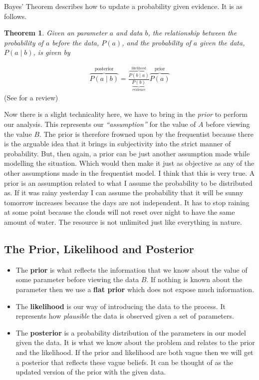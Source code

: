 \documentclass[12pt,twoside]{report}   %
\newtheorem{theorem}{Theorem}[section]
\begin{document}
Bayes' Theorem describes how to update a probability given evidence. It is as follows.
\vspace{5pt}
\begin{theorem}
Given an parameter $a$ and data $b$, the relationship between the probability of $a$ before the data, $P(a)$, and the probability of $a$ given the data, $P(a\mid b)$, is given by
\end{theorem}
\begin{align}\label{Bayes' Formula}
\overbrace{P(a\mid b)}^\text{posterior} = \frac{\overbrace{P(b\mid a)}^\text{likelihood}}{\underbrace{P(b)}_\text{evidence}} \overbrace{P(a)}^\text{prior}
\end{align}
(See \cite{1} for a review)

Now there is a slight technicality here, we have to bring in the \textit{prior} to perform our analysis. This represents our \textit{``assumption''} for the value of $A$ before viewing the value $B$. The prior is therefore frowned upon by the frequentist because there is the arguable idea that it brings in subjectivity into the strict manner of probability. But, then again, a prior can be just another assumption made while modelling the situation. Which would then make it just as objective as any of the other assumptions made in the frequentist model. I think that this is very true. A prior is an assumption related to what I assume the probability to be distributed as. If it was rainy yesterday I can assume the probability that it will be sunny tomorrow increases because the days are not independent. It has to stop raining at some point because the clouds will not reset over night to have the same amount of water. The resource is not unlimited just like everything in nature.

\subsection{The Prior, Likelihood and Posterior}\label{The Prior, Likelihood and Posterior}

\begin{itemize}
\item The \textbf{prior} is what reflects the information that we know about the value of some parameter before viewing the data $B$. If nothing is known about the parameter then we use a \textbf{flat prior} which does not expose much information.
\item The \textbf{likelihood} is our way of introducing the data to the process. It represents how \textit{plausible} the data is observed given a set of parameters.
\item The \textbf{posterior} is a probability distribution of the parameters in our model given the data. It is what we know about the problem and relates to the prior and the likelihood. If the prior and likelihood are both vague then we will get a posterior that reflects these vague beliefs. It can be thought of as the updated version of the prior with the given data.
\end{itemize}
\end{document}
